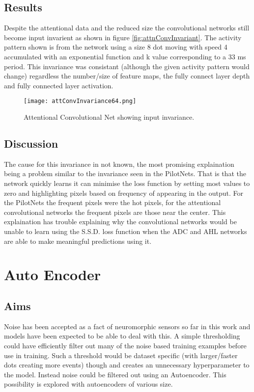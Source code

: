 \subsection{Results}
Despite the attentional data and the reduced size the convolutional networks still become input invarient as shown in figure \ref{fig:attnConvInvariant}.
The activity pattern shown is from the network using a size 8 dot moving with speed 4 accumulated with an exponential function and k value corresponding to a 33 ms period.
This invariance was consistant (although the given activity pattern would change) regardless the number/size of feature maps, the fully connect layer depth and fully connected layer activation.

\begin{figure}[h]
    \centering
    \texttt{[image: attConvInvariance64.png]}
    \caption{Attentional Convolutional Net showing input invariance.}
    \label{fig:AHLrelu}
\end{figure}

\subsection{Discussion}
The cause for this invariance in not known, the most promising explaination being a problem similar to the invariance seen in the PilotNets.
That is that the network quickly learns it can minimise the loss function by setting most values to zero and highlighting pixels based on frequency of appearing in the output.
For the PilotNets the frequent pixels were the hot pixels, for the attentional convolutional networks the frequent pixels are those near the center.
This explaination has trouble explaining why the convolutional networks would be unable to learn using the S.S.D. loss function when the ADC and AHL networks are able to make meaningful predictions using it.  

\section{Auto Encoder}
\subsection{Aims}
Noise has been accepted as a fact of neuromorphic sensors so far in this work and models have been expected to be able to deal with this.
A simple thresholding could have efficiently filter out many of the noise based training examples before use in training. 
Such a threshold would be dataset specific (with larger/faster dots creating more events) though and creates an unnecessary hyperparameter to the model. 
Instead noise could be filtered out using an Autoencoder.
This possibility is explored with autoencoders of various size.

